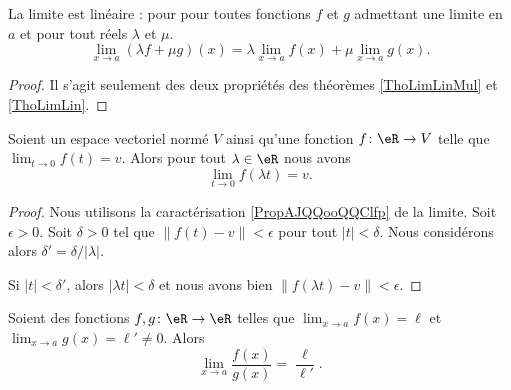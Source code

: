 \begin{proposition}     \label{PROPooVLBWooVttvFK}
    La limite est linéaire : pour pour toutes fonctions $f$ et $g$ admettant une limite en $a$ et pour tout réels $\lambda$ et $\mu$.
    \begin{equation}
        \lim_{x\to a} (\lambda f+\mu g)(x)=\lambda\lim_{x\to a} f(x)+\mu\lim_{x\to a} g(x).
    \end{equation}
\end{proposition}

\begin{proof}
    Il s'agit seulement des deux propriétés des théorèmes \ref{ThoLimLinMul} et \ref{ThoLimLin}.
\end{proof}

\begin{lemma}       \label{LEMooYJGLooVBaglB}
    Soient un espace vectoriel normé \( V\) ainsi qu'une fonction \( f\colon \eR\to V\) telle que \( \lim_{t\to 0} f(t)=v\). Alors pour tout \( \lambda\in \eR\) nous avons
    \begin{equation}
        \lim_{t\to 0} f(\lambda t)=v.
    \end{equation}
\end{lemma}

\begin{proof}
    Nous utilisons la caractérisation \eqref{PropAJQQooQQClfp} de la limite. Soit \( \epsilon>0\). Soit \( \delta>0\) tel que \( \| f(t)-v \|<\epsilon\) pour tout \( | t |<\delta\). Nous considérons alors \( \delta'=\delta/| \lambda |\).

    Si \( | t |<\delta'\), alors \( | \lambda t |<\delta\) et nous avons bien \( \| f(\lambda t)-v \|<\epsilon\).
\end{proof}

\begin{proposition}      \label{PROPooOUPNooTrClHw}
    Soient des fonctions \( f,g\colon \eR\to \eR\) telles que \( \lim_{x\to a} f(x)=\ell\) et \( \lim_{x\to a} g(x)=\ell'\neq 0\). Alors
    \begin{equation}
        \lim_{x\to a} \frac{ f(x) }{ g(x) }=\frac{ \ell }{ \ell' }.
    \end{equation}
\end{proposition}

